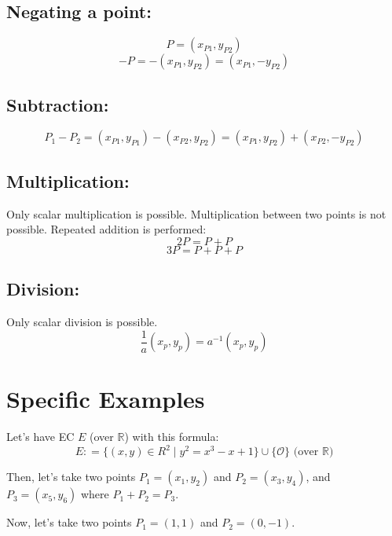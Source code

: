 \documentclass[bp,en]{FEIstyle}
\begin{document}
\subsection*{Negating a point:}
\[ P = (x_{P1}, y_{P2}) \]
\[ -P = -(x_{P1}, y_{P2}) = (x_{P1}, - y_{P2})
\]
\subsection*{Subtraction:}
\[
P_1 - P_2 = (x_{P1}, y_{P1}) - (x_{P2}, y_{P2}) = (x_{P1}, y_{P2}) + (x_{P2}, -y_{P2})
\]
\subsection*{Multiplication:}
Only scalar multiplication is possible. Multiplication between two points is not possible. Repeated addition is performed:
\[
2P = P + P 
\]
\[
3P = P + P + P 
\]%
\subsection*{Division:}
Only scalar division is possible. 
\[
\frac{1}{a} (x_p, y_p) = a^{-1} (x_p, y_p)
\]

\section*{Specific Examples}

Let's have EC $E$ (over $\mathbb{R}$) with this formula:
\[
E: = \{ (x,y) \in R^2 \mid y^2=x^3-x+1\}\cup\{\mathcal{O}\} 
\text{  (over $\mathbb{R}$)}
\]

Then, let's take two points $P_1 = (x_1, y_2)$ and $P_2 = (x_3, y_4)$, and $P_3 = (x_5, y_6)$ where $P_1 + P_2 = P_3$.

Now, let's take two points $P_1 = (1, 1)$ and $P_2 = (0, -1)$.
\end{document}
